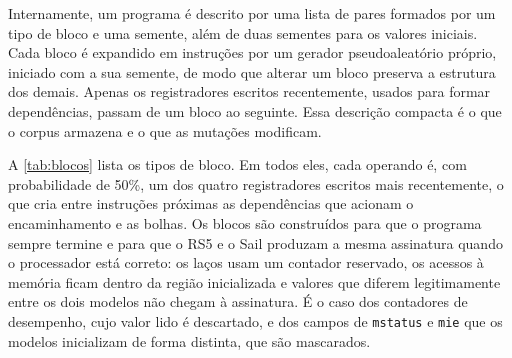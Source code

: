 Internamente, um programa é descrito por uma lista de pares formados por um tipo de bloco e uma semente, além de duas sementes para os valores iniciais. Cada bloco é expandido em instruções por um gerador pseudoaleatório próprio, iniciado com a sua semente, de modo que alterar um bloco preserva a estrutura dos demais. Apenas os registradores escritos recentemente, usados para formar dependências, passam de um bloco ao seguinte. Essa descrição compacta é o que o corpus armazena e o que as mutações modificam.

A \cref{tab:blocos} lista os tipos de bloco. Em todos eles, cada operando é, com probabilidade de 50\%, um dos quatro registradores escritos mais recentemente, o que cria entre instruções próximas as dependências que acionam o encaminhamento e as bolhas. Os blocos são construídos para que o programa sempre termine e para que o RS5 e o Sail produzam a mesma assinatura quando o processador está correto: os laços usam um contador reservado, os acessos à memória ficam dentro da região inicializada e valores que diferem legitimamente entre os dois modelos não chegam à assinatura. É o caso dos contadores de desempenho, cujo valor lido é descartado, e dos campos de \texttt{mstatus} e \texttt{mie} que os modelos inicializam de forma distinta, que são mascarados.


